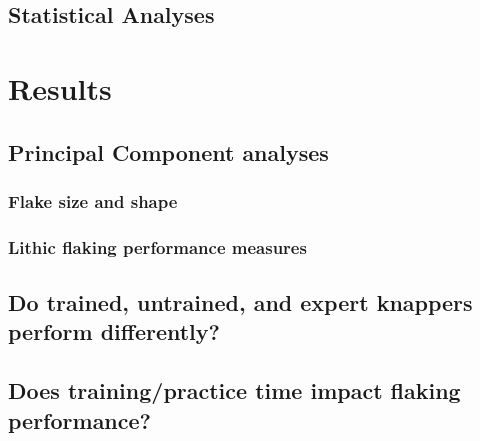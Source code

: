 \documentclass[smallextended]{svjour3}       %
\begin{document}
\hypertarget{statistical-analyses}{%
\subsection{\texorpdfstring{\textbf{Statistical
Analyses}}{Statistical Analyses}}\label{statistical-analyses}}

\hypertarget{results}{%
\section{\texorpdfstring{\textbf{Results}}{Results}}\label{results}}

\hypertarget{principal-component-analyses}{%
\subsection{\texorpdfstring{\textbf{Principal Component
analyses}}{Principal Component analyses}}\label{principal-component-analyses}}

\hypertarget{flake-size-and-shape}{%
\subsubsection{\texorpdfstring{\textbf{Flake size and
shape}}{Flake size and shape}}\label{flake-size-and-shape}}

\hypertarget{lithic-flaking-performance-measures}{%
\subsubsection{\texorpdfstring{\textbf{Lithic flaking performance
measures}}{Lithic flaking performance measures}}\label{lithic-flaking-performance-measures}}

\hypertarget{do-trained-untrained-and-expert-knappers-perform-differently}{%
\subsection{\texorpdfstring{\textbf{Do trained, untrained, and expert
knappers perform
differently?}}{Do trained, untrained, and expert knappers perform differently?}}\label{do-trained-untrained-and-expert-knappers-perform-differently}}

\hypertarget{does-trainingpractice-time-impact-flaking-performance}{%
\subsection{\texorpdfstring{\textbf{Does training/practice time impact
flaking
performance?}}{Does training/practice time impact flaking performance?}}\label{does-trainingpractice-time-impact-flaking-performance}}
\end{document}
